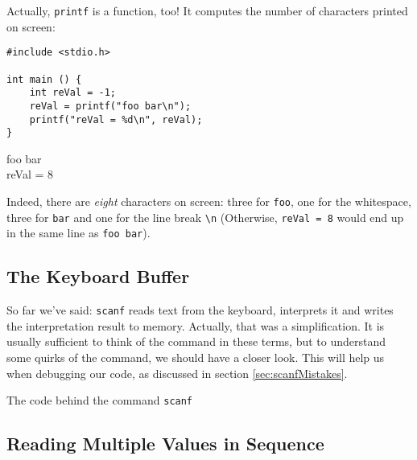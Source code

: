 \begin{hintbox}
Actually, \texttt{printf} is a function, too! It computes the number of characters printed on screen:

\begin{tcbraster}[raster columns=2,
                  raster equal height,
                  nobeforeafter,
                  raster column skip=0.2cm]
\begin{codebox}[printCount.c]
\begin{verbatim}
#include <stdio.h>

int main () {
    int reVal = -1;
    reVal = printf("foo bar\n");
    printf("reVal = %d\n", reVal);
}
\end{verbatim}
\end{codebox}
%
\begin{cmdbox}
foo bar \\
reVal = 8
\end{cmdbox}
\end{tcbraster}

Indeed, there are \emph{eight} characters on screen: three for \texttt{foo}, one for the whitespace, three for \texttt{bar} and one for the line break \texttt{\textbackslash n} (Otherwise, \texttt{reVal = 8} would end up in the same line as \texttt{foo bar}).
\end{hintbox}

\subsection{The Keyboard Buffer}
So far we've said: \texttt{scanf} reads text from the keyboard, interprets it and writes the interpretation result to memory. Actually, that was a simplification. It is usually sufficient to think of the command in these terms, but to understand some quirks of the command, we should have a closer look. This will help us when debugging our code, as discussed in section \ref{sec:scanfMistakes}.

The code behind the command \texttt{scanf}



\subsection{Reading Multiple Values in Sequence} \label{sec:ScanfMultiValues}


